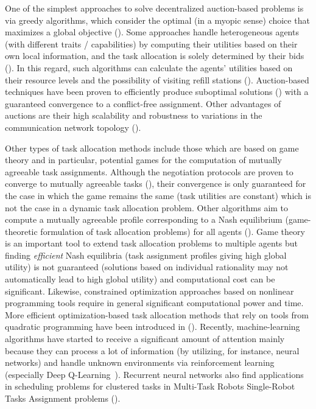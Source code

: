 \documentclass{ifacconf}
\begin{document}
One of the simplest approaches to solve decentralized auction-based problems is via greedy algorithms, which consider the optimal (in a myopic sense) choice that maximizes a global objective (\cite{p:luo2012}).
Some approaches handle heterogeneous agents (with different traits / capabilities) by computing their utilities based on their own local information, and the task allocation is solely determined by their bids (\cite{p:ravichandar2019}).
In this regard, such algorithms can calculate the agents' utilities based on their resource levels and the possibility of visiting refill stations (\cite{p:lee2018}).
Auction-based techniques have been proven to efficiently produce suboptimal solutions (\cite{p:gerkey2004}) with a guaranteed convergence to a conflict-free assignment. Other advantages of auctions are their high scalability and robustness to variations in the communication network topology (\cite{p:whitbrook2019, p:otte2020}).

Other types of task allocation methods include those which are based on game theory and in particular, potential games for the computation of mutually agreeable task assignments. Although the negotiation protocols are proven to converge to mutually agreeable tasks (\cite{p:shamma2007}), their convergence is only guaranteed for the case in which the game remains the same (task utilities are constant) which is not the case in a dynamic task allocation problem. 
Other algorithms aim to compute a mutually agreeable profile corresponding to a Nash equilibrium (game-theoretic formulation of task allocation problems) for all agents (\cite{p:bakolas2020}). Game theory is an important tool to extend task allocation problems to multiple agents but finding \textit{efficient} Nash equilibria (task assignment profiles giving high global utility) is not guaranteed (solutions based on individual rationality may not automatically lead to high global utility) and computational cost can be significant.
Likewise, constrained optimization approaches based on nonlinear programming tools require in general significant computational power and time. More efficient optimization-based task allocation methods that rely on tools from quadratic programming have been introduced in (\cite{p:bakshi2019quad}).
Recently, machine-learning algorithms have started to receive a significant amount of attention mainly because they can process a lot of information (by utilizing, for instance, neural networks) and handle unknown environments via reinforcement learning (especially Deep Q-Learning~\cite{p:gautier2020}). Recurrent neural networks also find applications in scheduling problems for clustered tasks in Multi-Task Robots Single-Robot Tasks Assignment problems (\cite{p:bakshi2019}).
\end{document}
